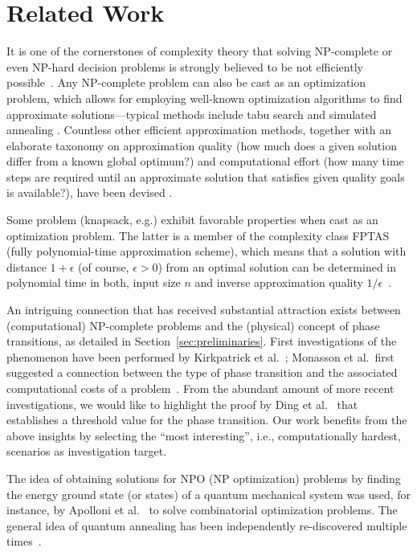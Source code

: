 \section{Related Work}
\label{sec:related-work}

It is one of the cornerstones of complexity theory that solving NP-complete or even NP-hard decision problems is strongly believed to be not efficiently possible~\cite{cook1971complexity,murty1987some}. Any NP-complete problem can also be cast as an optimization problem, which allows for employing well-known optimization algorithms to find approximate solutions---typical methods include tabu search \cite{glover2013tabu,gendreau1994tabu} and simulated annealing \cite{kirkpatrick1983optimization,chen1995chaotic}. Countless other efficient approximation methods, together with an elaborate taxonomy on approximation quality (how much does a given solution differ from a known global optimum?) and computational effort (how many time steps are required until an approximate solution that satisfies given quality goals is available?), have been devised \cite{Ausiello1999}.

Some problem (knapsack, e.g.) exhibit favorable properties when cast as an optimization problem. The latter is a member of the complexity class FPTAS (fully polynomial-time approximation scheme), which means that a solution with distance \(1+\epsilon\) (of course, $\epsilon > 0$) from an optimal solution can be determined in polynomial time in both, input size \(n\) and inverse approximation quality \(1/\epsilon\)~\cite{chen1995chaotic}.

An intriguing connection that has received substantial attraction exists between (computational) NP-complete problems and the (physical) concept of phase transitions, as detailed in Section~\ref{sec:preliminaries}. First investigations of the phenomenon have been performed by Kirkpatrick et al.~\cite{kirkpatrick1994critical}; Monasson et al.\ first suggested a connection between the type of phase transition and the associated computational costs of a problem~\cite{monasson1999determining}. From the abundant amount of more recent investigations, we would like to highlight the proof by Ding et al.~\cite{ding2015proof} that establishes a threshold value for the phase transition. Our work benefits from the above insights by selecting the ``most interesting'', i.e., computationally hardest, scenarios as investigation target.

The idea of obtaining solutions for NPO (NP optimization) problems by finding the energy ground state (or states) of a quantum mechanical system was used, for instance, by Apolloni et al.~\cite{apolloni1989quantum,apolloni1988numerical} to solve combinatorial optimization problems. The general idea of quantum annealing has been independently re-discovered multiple times~\cite{albash2016adiabatic,finnila1994quantum,amara1993global,kadowaki1998quantum}.

